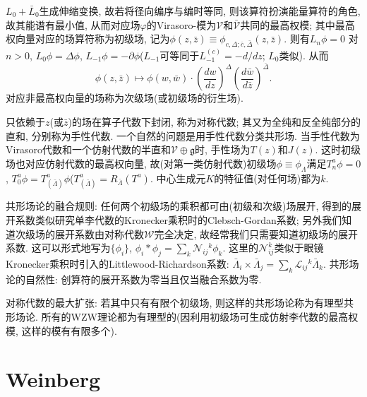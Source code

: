 \documentclass{ctexart}%
\theoremstyle{definition}
\theoremstyle{remark}
\begin{document}
$L_0+\bar{L}_0$生成伸缩变换, 故若将径向编序与编时等同, 则该算符扮演能量算符的角色, 故其能谱有最小值, 从而对应场$\varphi$的Virasoro-模为$\mathcal{V}$和$\bar{\mathcal{V}}$共同的最高权模; 其中最高权向量对应的场算符称为初级场, 记为$\phi(z,\bar{z}) \equiv \phi_{c,\Delta;\bar{c},\bar{\Delta}}(z,\bar{z})$. 则有$L_n\phi=0$ 对$n>0$, $L_0\phi = \Delta \phi$, $L_{-1}\phi=-\partial \phi$($L_{-1}$可等同于$L^{(c)}_{-1} = -d/dz$; $L_0$类似). 从而
$$\phi(z,\bar{z}) \mapsto \phi(w,\bar{w}) \cdot \left(\frac{d w}{dz}\right)^\Delta \left( \frac{d \bar{w}}{d \bar{z}}\right)^{\bar{\Delta}}.$$
对应非最高权向量的场称为次级场(或初级场的衍生场).

只依赖于$z$(或$\bar{z}$)的场在算子代数下封闭, 称为对称代数; 其又为全纯和反全纯部分的直和, 分别称为手性代数. 一个自然的问题是用手性代数分类共形场. 当手性代数为Virasoro代数和一个仿射代数的半直和$\mathcal{V}\oplus \mathfrak{g}$时, 手性场为$T(z)$和$J(z)$. 这时初级场也对应仿射代数的最高权向量, 故(对第一类仿射代数)初级场$\phi\equiv \phi_\Lambda$满足$T^a_n\phi =0$, $T^a_0 \phi = T^a_{(\bar{\Lambda})}\phi$($T^a_{(\bar{\Lambda})} = R_{\bar{\Lambda}}(T^a)$. 中心生成元$K$的特征值(对任何场)都为$k$.


共形场论的融合规则: 任何两个初级场的乘积都可由(初级和次级)场展开, 得到的展开系数类似研究单李代数的Kronecker乘积时的Clebsch-Gordan系数; 另外我们知道次级场的展开系数由对称代数$\mathcal{W}$完全决定, 故经常我们只需要知道初级场的展开系数. 这可以形式地写为$\{\phi_i\}$, $\phi_i\ast \phi_j = \sum_k \mathcal{N}_{ij}{}^k \phi_k$. 这里的$\mathcal{N}_{ij}^k$类似于眼镜Kronecker乘积时引入的Littlewood-Richardson系数: $\bar{\Lambda}_i\times \bar{\Lambda}_j = \sum_k \mathcal{L}_{ij}{}^k \bar{\Lambda}_k$. 共形场论的自然性: 创算符的展开系数为零当且仅当融合系数为零. 

对称代数的最大扩张: 若其中只有有限个初级场, 则这样的共形场论称为有理型共形场论. 所有的WZW理论都为有理型的(因利用初级场可生成仿射李代数的最高权模, 这样的模有有限多个).



\section{Weinberg}
\end{document}
